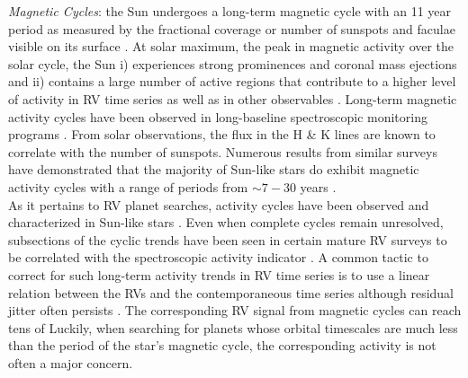 \emph{Magnetic Cycles}:
the Sun undergoes a long-term magnetic cycle with an 11 year period as measured by the
fractional coverage or number of sunspots and faculae visible on its surface \citep{hathaway10}.
At solar maximum, the 
peak in magnetic activity over the solar cycle, the Sun i) experiences strong prominences
and coronal mass ejections and ii) contains a large number of active regions that contribute
to a higher level of activity in RV time series as well as in other observables
\citep{maunder04}. Long-term magnetic activity cycles have been observed in long-baseline
spectroscopic monitoring programs \citep{santos10}. From solar observations, the flux in the
\caii{} H \& K lines are known to correlate with the number of sunspots. Numerous results from
similar surveys have 
demonstrated that the majority of Sun-like stars do exhibit magnetic activity cycles
with a range of periods from $\sim 7-30$ years \citep{duncan91,lockwood97,balinunas98}. \\

As it pertains to RV planet searches, activity cycles have been 
observed and characterized in Sun-like stars \citep{baliunas95}. 
Even when complete cycles remain unresolved, subsections of the cyclic trends have been seen in
certain mature RV surveys to be correlated with
the \Rhk{} spectroscopic activity indicator \citep[e.g.][]{lovis11}.
A common tactic to correct for such long-term activity trends in RV time series is to use a linear
relation between the RVs and the contemporaneous \Rhk{} time series although residual jitter
often persists \citep{dumusque12}. The corresponding RV signal from magnetic cycles can reach tens of
 Luckily, when searching for
planets whose orbital timescales are much less than the period of the star's magnetic cycle, the
corresponding activity is not often a major concern. \\



